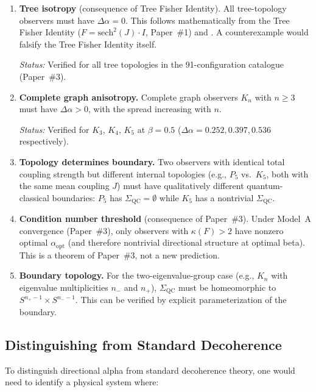 \documentclass[11pt,a4paper]{article}
\theoremstyle{plain}
\theoremstyle{definition}
\newcommand{\SigmaQC}{\Sigma_{\mathrm{QC}}}
\newcommand{\alphaopt}{\alpha_{\mathrm{opt}}}
\begin{document}
\begin{enumerate}[label=(P\arabic*)]
\item \textbf{Tree isotropy} (consequence of Tree Fisher Identity).
  All tree-topology observers must have $\Delta\alpha = 0$.
  This follows mathematically from the Tree Fisher Identity
  ($F = \mathrm{sech}^2(J) \cdot I$, Paper~\#1) and
  .  A counterexample would falsify
  the Tree Fisher Identity itself.

  \emph{Status:} Verified for all tree topologies in the
  91-configuration catalogue (Paper~\#3).

\item \textbf{Complete graph anisotropy.}
  Complete graph observers $K_n$ with $n \geq 3$ must have
  $\Delta\alpha > 0$, with the spread increasing with $n$.

  \emph{Status:} Verified for $K_3$, $K_4$, $K_5$ at $\beta = 0.5$
  ($\Delta\alpha = 0.252, 0.397, 0.536$ respectively).

\item \textbf{Topology determines boundary.}
  Two observers with identical total coupling strength but
  different internal topologies (e.g., $P_5$ vs.\ $K_5$, both
  with the same mean coupling $J$) must have qualitatively
  different quantum-classical boundaries: $P_5$ has
  $\SigmaQC = \emptyset$ while $K_5$ has a nontrivial $\SigmaQC$.

\item \textbf{Condition number threshold} (consequence of Paper~\#3).
  Under Model~A convergence (Paper~\#3), only observers with
  $\kappa(F) > 2$ have nonzero optimal $\alphaopt$ (and
  therefore nontrivial directional structure at optimal beta).
  This is a theorem of Paper~\#3, not a new prediction.

\item \textbf{Boundary topology.}
  For the two-eigenvalue-group case (e.g., $K_n$ with eigenvalue
  multiplicities $n_-$ and $n_+$), $\SigmaQC$ must be
  homeomorphic to $S^{n_+-1} \times S^{n_--1}$.  This can
  be verified by explicit parameterization of the boundary.
\end{enumerate}

\subsection{Distinguishing from Standard Decoherence}

To distinguish directional alpha from standard decoherence theory,
one would need to identify a physical system where:
\end{document}
